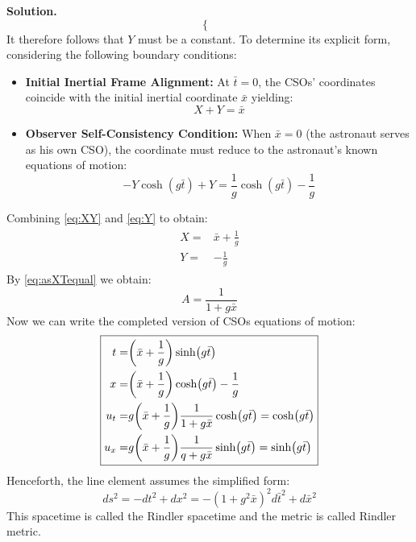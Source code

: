 \documentclass[12pt, a4paper, oneside]{article}
\newenvironment{solution}{\par\noindent\textbf{Solution. }}{\par}
\begin{document}
\begin{solution}
\begin{equation}
\begin{cases}
        \end{cases}
    \end{equation}
    It therefore follows that $Y$ must be a constant. To determine its explicit form, considering the following boundary conditions:
    \begin{itemize}
        \item \textbf{Initial Inertial Frame Alignment:} At $\bar{t}=0$, the CSOs' coordinates coincide with the initial inertial coordinate $\bar{x}$ yielding:
        \begin{equation}
            X+Y=\bar{x}\label{eq:XY}
        \end{equation}
        \item \textbf{Observer Self-Consistency Condition:} When $\bar{x}=0$ (the astronaut serves as his own CSO), the coordinate must reduce to the astronaut's known equations of motion:
        \begin{equation}
            -Y\cosh(g\bar{t})+Y=\frac{1}{g}\cosh(g\bar{t})-\frac{1}{g}\label{eq:Y}
        \end{equation}
    \end{itemize}
    Combining \cref{eq:XY} and \cref{eq:Y} to obtain:
    \begin{align}
        \boxed{
            \begin{aligned}
                X=&\bar{x}+\frac{1}{g}\\
                Y=&-\frac{1}{g}
            \end{aligned}
        }
    \end{align}
    By \cref{eq:asXTequal} we obtain:
    \begin{equation}
        \boxed{A=\frac{1}{1+g\bar{x}}}
    \end{equation}
    Now we can write the completed version of CSOs equations of motion:
    \begin{align}
        \boxed{
            \begin{aligned}
                t=&\qty(\bar{x}+\frac{1}{g})\sinh(g\bar{t})\\
                x=&\qty(\bar{x}+\frac{1}{g})\cosh(g\bar{t})-\frac{1}{g}\\
                u_t=&g\qty(\bar{x}+\frac{1}{g})\frac{1}{1+g\bar{x}}\cosh(g\bar{t})=\cosh(g\bar{t})\\
                u_x=&g\qty(\bar{x}+\frac{1}{g})\frac{1}{q+g\bar{x}}\sinh(g\bar{t})=\sinh(g\bar{t})
            \end{aligned}
        }
    \end{align}
    Henceforth, the line element assumes the simplified form:
    \begin{equation}
        \boxed{ds^2=-dt^2+dx^2=-(1+g^2\bar{x})^2d\bar{t}^2+d\bar{x}^2}
    \end{equation}
    This spacetime is called the Rindler spacetime and the metric is called Rindler metric.
\end{solution}
\end{document}
